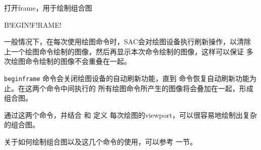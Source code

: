\label{cmd:beginframe}

打开frame，用于绘制组合图

\begin{SACSTX}
B!EGIN!F!RAME!
\end{SACSTX}

一般情况下，在每次使用绘图命令时，SAC会对绘图设备执行刷新操作，以清除
上一个绘图命令绘制的图像，然后再显示本次命令绘制的图像，这样可以保证
多次绘图命令绘制的图像不会重叠在一起。

\texttt{beginframe} 命令会关闭绘图设备的自动刷新功能，直到
 命令恢复自动刷新功能为止。在这两个命令中间执行的
所有绘图命令所产生的图像将会叠加在一起，形成组合图。

通过这两个命令，并结合  和  定义
每次绘图的viewport，可以很容易地绘制出复杂的组合图。

关于如何绘制组合图以及这几个命令的使用，可以参考
 一节。
